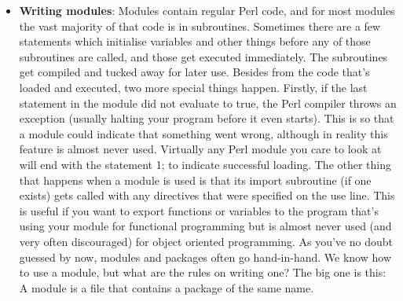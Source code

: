 \documentclass{report}
\begin{document}
\begin{itemize}
            \bigbreak \noindent 
            Many of the popular CPAN modules are pre-packaged for popular operating systems. In addition, the CPAN module that comes with Perl can make the task of finding and installing modules from CPAN much easier.
            \bigbreak \noindent 
            Most CPAN modules come with README and/or INSTALL files which tell you how to install the modules. This may vary between operating systems. On Unix and Unix-like operating systems the process is usually:
            \bigbreak \noindent 
            \begin{perlcode}
            perl Makefile.PL
            make
            make test
            make install
            \end{perlcode}
            \bigbreak \noindent 
            For ActiveState Perl installations (which includes most Microsoft Windows machines) the use of PPM (Programmer’s Package Manager) is recommended. PPM provides a command line interface for downloading and installing pre-compiled versions of most CPAN modules.
        \item \textbf{Writing modules}: Modules contain regular Perl code, and for most modules the vast majority of that code is in subroutines. Sometimes there are a few statements which initialise variables and other things before any of those subroutines are called, and those get executed immediately. The subroutines get compiled and tucked away for later use.
            \bigbreak \noindent 
            Besides from the code that’s loaded and executed, two more special things happen. Firstly, if the last statement in the module did not evaluate to true, the Perl compiler throws an exception (usually halting your program before it even starts). This is so that a module could indicate that something went wrong, although in reality this feature is almost never used. Virtually any Perl module you care to look at will end with the statement 1; to indicate successful loading.
            \bigbreak \noindent 
            The other thing that happens when a module is used is that its import subroutine (if one exists) gets called with any directives that were specified on the use line. This is useful if you want to export functions or variables to the program that’s using your module for functional programming but is almost never used (and very often discouraged) for object oriented programming.
            \bigbreak \noindent 
            As you’ve no doubt guessed by now, modules and packages often go hand-in-hand. We know how to use a module, but what are the rules on writing one? The big one is this: A module is a file that contains a package of the same name.

\end{itemize}
\end{document}
